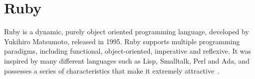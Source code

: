 \section{Ruby}\label{sec:technologies:ruby}

Ruby is a dynamic, purely object oriented programming language, developed by Yukihiro Matsumoto, released in 1995. Ruby supports multiple programming paradigms, including functional, object-oriented, imperative and reflexive. It was inspired by many different languages such as Lisp, Smalltalk, Perl and Ada, and possesses a series of characteristics that make it extremely attractive~\cite{ruby}.

